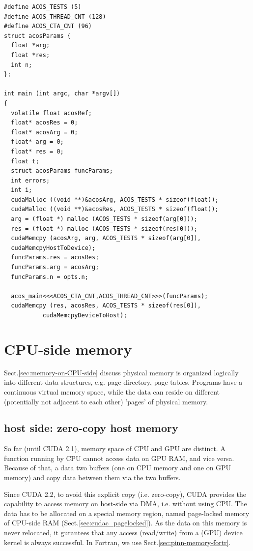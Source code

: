 \begin{lstlisting}
#define ACOS_TESTS (5)
#define ACOS_THREAD_CNT (128)
#define ACOS_CTA_CNT (96)
struct acosParams {
  float *arg;
  float *res;
  int n;
};

int main (int argc, char *argv[])
{
  volatile float acosRef;
  float* acosRes = 0;
  float* acosArg = 0;
  float* arg = 0;
  float* res = 0;
  float t;
  struct acosParams funcParams;
  int errors;
  int i;
  cudaMalloc ((void **)&acosArg, ACOS_TESTS * sizeof(float));
  cudaMalloc ((void **)&acosRes, ACOS_TESTS * sizeof(float));
  arg = (float *) malloc (ACOS_TESTS * sizeof(arg[0]));
  res = (float *) malloc (ACOS_TESTS * sizeof(res[0]));
  cudaMemcpy (acosArg, arg, ACOS_TESTS * sizeof(arg[0]),
  cudaMemcpyHostToDevice);
  funcParams.res = acosRes;
  funcParams.arg = acosArg;
  funcParams.n = opts.n;

  acos_main<<<ACOS_CTA_CNT,ACOS_THREAD_CNT>>>(funcParams);
  cudaMemcpy (res, acosRes, ACOS_TESTS * sizeof(res[0]),
           cudaMemcpyDeviceToHost);
\end{lstlisting}

\section{CPU-side memory}


Sect.\ref{sec:memory-on-CPU-side} discuss physical memory is organized logically
into different data structures, e.g. page directory, page tables.
Programs have a continuous virtual memory space, while the data can reside on
different (potentially not adjacent to each other) 'pages' of physical memory.



\subsection{host side: zero-copy host memory}
\label{sec:cudac_zero-copy}
\label{sec:zero-copied-memory}
\label{sec:cudaHostAlloc()}

So far (until CUDA 2.1), memory space of CPU and GPU are distinct. A function running by CPU
cannot access data on GPU RAM, and vice versa. Because of that, a data two
buffers (one on CPU memory and one on GPU memory) and copy data between them via
the two buffers.

Since CUDA 2.2, to avoid this explicit copy (i.e. zero-copy), CUDA provides the
capability to access memory on host-side via DMA, i.e. without using CPU.
The data has to be allocated on a special memory region, named page-locked
memory of CPU-side RAM (Sect.\ref{sec:cudac_pagelocked}). As the data on this
memory is never relocated, it gurantees that any access (read/write) from a
(GPU) device kernel is always successful. In Fortran, we use Sect.\ref{sec:pinn-memory-fortr}.

